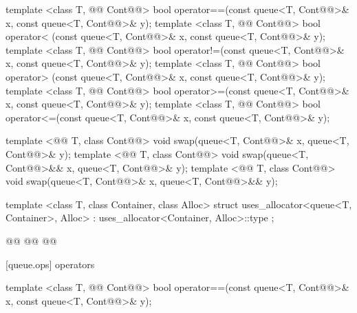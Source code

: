 \documentclass[american,twoside]{book}
\begin{document}
\begin{codeblock}
{  template <class T, @@ Cont@@>
    bool operator==(const queue<T, Cont@@>& x, const queue<T, Cont@@>& y);
  template <class T, @@ Cont@@>
    bool operator< (const queue<T, Cont@@>& x, const queue<T, Cont@@>& y);
  template <class T, @@ Cont@@>
    bool operator!=(const queue<T, Cont@@>& x, const queue<T, Cont@@>& y);
  template <class T, @@ Cont@@>
    bool operator> (const queue<T, Cont@@>& x, const queue<T, Cont@@>& y);
  template <class T, @@ Cont@@>
    bool operator>=(const queue<T, Cont@@>& x, const queue<T, Cont@@>& y);
  template <class T, @@ Cont@@>
    bool operator<=(const queue<T, Cont@@>& x, const queue<T, Cont@@>& y);

  template <@@ T, class Cont@@>
    void swap(queue<T, Cont@@>& x, queue<T, Cont@@>& y);
  template <@@ T, class Cont@@>
    void swap(queue<T, Cont@@>&& x, queue<T, Cont@@>& y);
  template <@@ T, class Cont@@>
    void swap(queue<T, Cont@@>& x, queue<T, Cont@@>&& y);

  template <class T, class Container, class Alloc>
    struct uses_allocator<queue<T, Container>, Alloc>
      : uses_allocator<Container, Alloc>::type { };

  @@
    @@
      @@
}
\end{codeblock}

[queue.ops]{ operators}

%
\begin{itemdecl}
template <class T, @@ Cont@@>
    bool operator==(const queue<T, Cont@@>& x,
                    const queue<T, Cont@@>& y);
\end{itemdecl}
\end{document}
